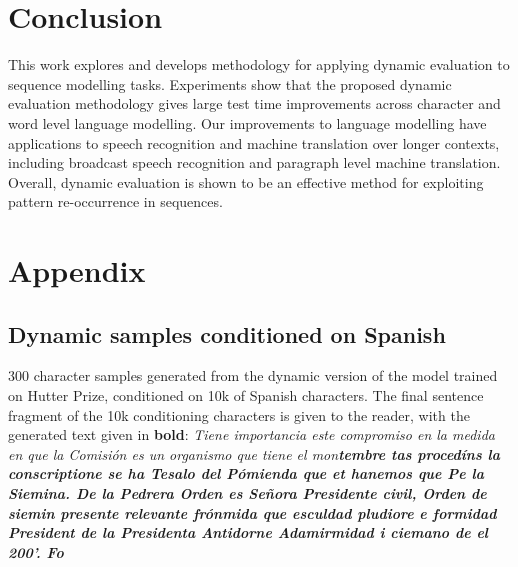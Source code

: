 \documentclass{article} %
\begin{document}
\section{Conclusion}

This work explores and develops methodology for applying dynamic evaluation to sequence modelling tasks. Experiments show that the proposed dynamic evaluation methodology gives large test time improvements across character and word level language modelling. Our improvements to language modelling have applications to speech recognition and machine translation over longer contexts, including broadcast speech recognition and paragraph level machine translation. Overall, dynamic evaluation is shown to be an effective method for exploiting pattern re-occurrence in sequences.



{\setlength{\bibsep}{0pt plus 0.3ex}\footnotesize

}
\appendix
\section{Appendix}
\subsection{Dynamic samples conditioned on Spanish}
300 character samples generated from the dynamic version of the model trained on Hutter Prize, conditioned on 10k of Spanish characters. The final sentence fragment of the 10k conditioning characters is given to the reader, with the generated text given in \textbf{bold}:
\newline
\newline
\newline
\textsl{
Tiene importancia este compromiso en la medida en que la Comisión es un organismo que tiene el mon\textbf{tembre tas procedíns la conscriptione se ha Tesalo del Pómienda que et hanemos que Pe la Siemina.
\newline
De la Pedrera Orden es Señora Presidente civil, Orden de siemin presente relevante frónmida que esculdad pludiore e formidad President de la Presidenta Antidorne Adamirmidad i ciemano de el 200'. Fo}
}
\end{document}

